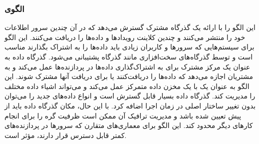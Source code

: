 \subsubsection{الگوی }
\label{distrDataBusSec}
\begin{RTL}
این الگو  را با ارائه یک گذرگاه
مشترک گسترش می‌دهد که در آن چندین سرور اطلاعات خود را منتشر می‌کنند و چندین
کلاینت رویدادها و داده‌ها را دریافت می‌کنند.
این الگو برای سیستم‌هایی که سرورها و کاربران زیادی
باید داده‌ها را به اشتراک بگذارند مناسب است
و توسط گذرگاه‌های سخت‌افزاری مانند گذرگاه  پشتیبانی می‌شود.
گذرگاه داده به عنوان یک مرکز مشترک برای به اشتراک‌گذاری داده‌ها در پردازنده‌ها
عمل می‌کند و به مشتریان اجازه می‌دهد که داده‌ها
را دریافت‌کنند یا برای دریافت آنها مشترک شوند.
این الگو به عنوان یک  با یک مخزن داده متمرکز عمل
می‌کند و می‌تواند اشیاء داده مختلف را مدیریت کند.
گذرگاه داده بسیار قابل گسترش است و انواع داده‌های جدید را
می‌توان بدون تغییر ساختار اصلی در زمان اجرا اضافه کرد.
با این حال، مکان گذرگاه داده باید از پیش تعیین شده باشد و مدیریت ترافیک
آن ممکن است ظرفیت گره را برای انجام کارهای دیگر محدود کند.
این الگو برای معماری‌های متقارن که سرورها در پردازنده‌های کمتر قابل
دسترس قرار دارند، مؤثر است.
\end{RTL}